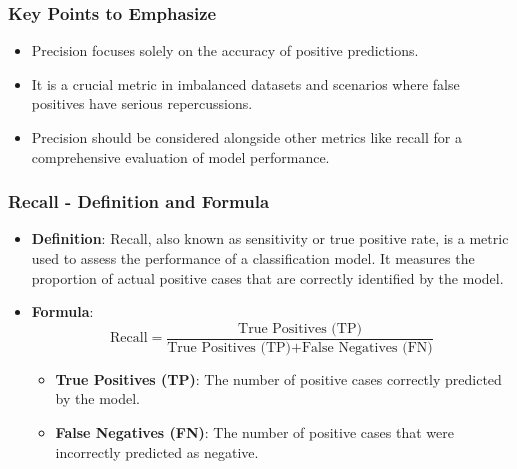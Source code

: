 \documentclass[aspectratio=169]{beamer}
\begin{document}
\begin{frame}[fragile]
    \frametitle{Key Points to Emphasize}
    \begin{itemize}
        \item Precision focuses solely on the accuracy of positive predictions.
        \item It is a crucial metric in imbalanced datasets and scenarios where false positives have serious repercussions.
        \item Precision should be considered alongside other metrics like recall for a comprehensive evaluation of model performance.
    \end{itemize}
\end{frame}

\begin{frame}[fragile]
    \frametitle{Recall - Definition and Formula}
    \begin{itemize}
        \item \textbf{Definition}:
        Recall, also known as sensitivity or true positive rate, is a metric used to assess the performance of a classification model. It measures the proportion of actual positive cases that are correctly identified by the model.
        
        \item \textbf{Formula}:
        \begin{equation}
            \text{Recall} = \frac{\text{True Positives (TP)}}{\text{True Positives (TP)} + \text{False Negatives (FN)}}
        \end{equation}
        \begin{itemize}
            \item \textbf{True Positives (TP)}: The number of positive cases correctly predicted by the model.
            \item \textbf{False Negatives (FN)}: The number of positive cases that were incorrectly predicted as negative.
        \end{itemize}
    \end{itemize}
\end{frame}
\end{document}
